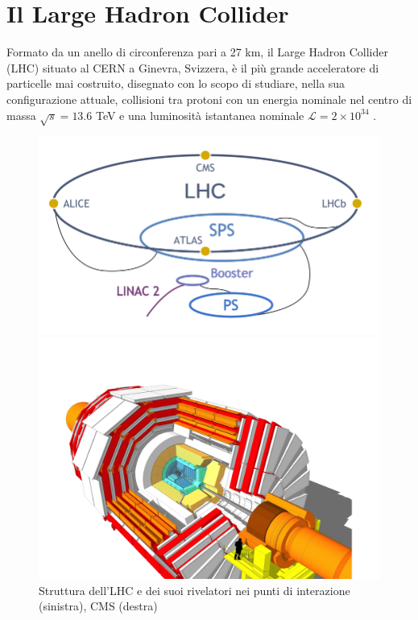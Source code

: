 \section{Il Large Hadron Collider}
\label{sec:LHC}
Formato da un anello di circonferenza pari a 27 km, il Large Hadron Collider (LHC) situato al CERN a Ginevra, Svizzera, è il più grande acceleratore di particelle mai costruito, disegnato con lo scopo di studiare, nella sua configurazione attuale, collisioni tra protoni con un energia nominale nel centro di massa $\sqrt{s} = 13.6$ TeV e una luminosità istantanea nominale $\mathcal{L} = 2 \times 10^{34}$ \Lumi. 
\begin{figure}[t]
  \centering
  \begin{minipage}[b]{0.43\textwidth}
      \centering
      \includegraphics[width=\textwidth]{../ImmaginiTesi/LHC.png} 
  \end{minipage}
  \hfill 
  \begin{minipage}[b]{0.56\textwidth}
      \centering
      \includegraphics[width=\textwidth]{../ImmaginiTesi/CMS.png} 
  \end{minipage}
  \caption{Struttura dell'LHC e dei suoi rivelatori nei punti di interazione (sinistra), CMS (destra)}
  \label{fig:LHC-CMS}
\end{figure}


